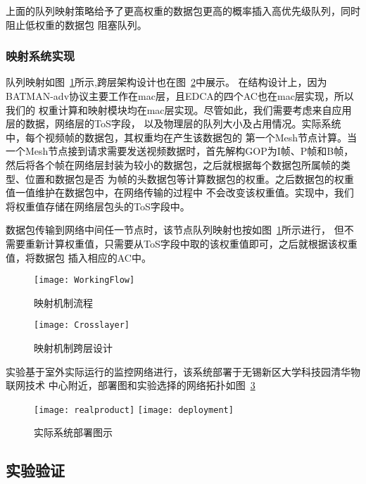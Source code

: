 上面的队列映射策略给予了更高权重的数据包更高的概率插入高优先级队列，同时阻止低权重的数据包
阻塞队列。

\subsubsection{映射系统实现}
队列映射如图~\ref{fig:workingflow}所示,跨层架构设计也在图~\ref{fig:crosslayer}中展示。
在结构设计上，因为BATMAN-adv协议主要工作在mac层，且EDCA的四个AC也在mac层实现，所以我们的
权重计算和映射模块均在mac层实现。尽管如此，我们需要考虑来自应用层的数据，网络层的ToS字段，
以及物理层的队列大小及占用情况。实际系统中，每个视频帧的数据包，其权重均在产生该数据包的
第一个Mesh节点计算。当一个Mesh节点接到请求需要发送视频数据时，首先解构GOP为I帧、P帧和B帧，
然后将各个帧在网络层封装为较小的数据包，之后就根据每个数据包所属帧的类型、位置和数据包是否
为帧的头数据包等计算数据包的权重。之后数据包的权重值一值维护在数据包中，在网络传输的过程中
不会改变该权重值。实现中，我们将权重值存储在网络层包头的ToS字段中。

数据包传输到网络中间任一节点时，该节点队列映射也按如图~\ref{fig:workingflow}所示进行，
但不需要重新计算权重值，只需要从ToS字段中取的该权重值即可，之后就根据该权重值，将数据包
插入相应的AC中。

\begin{figure}[H] %
  \centering
  \texttt{[image: WorkingFlow]}
  \caption{映射机制流程}
  \label{fig:workingflow}
\end{figure}
\begin{figure}[H] %
  \centering
  \texttt{[image: Crosslayer]}
  \caption{映射机制跨层设计}
  \label{fig:crosslayer}
\end{figure}

实验基于室外实际运行的监控网络进行，该系统部署于无锡新区大学科技园清华物联网技术
中心附近，部署图和实验选择的网络拓扑如图~\ref{fig:realdeploy}
\begin{figure}[h]
  \centering
  \subcaptionbox{}
      {\texttt{[image: realproduct]}}
  \hspace{1em}
  \subcaptionbox{}
    {\texttt{[image: deployment]}}
  \caption{实际系统部署图示}
  \label{fig:realdeploy}
\end{figure}


\subsection{实验验证}
\renewcommand{\thesubsubsection}{\Alph{subsubsection}.}

